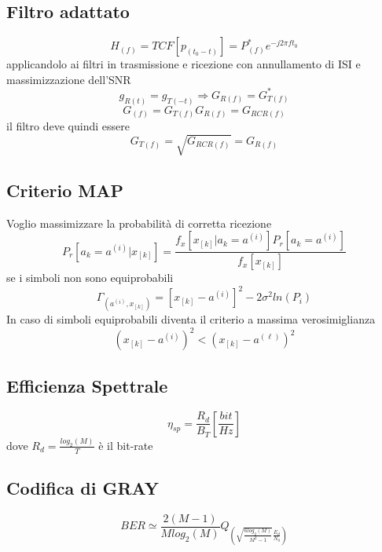     \subsection{Filtro adattato}
        \[
            H_{(f)} = TCF[p_{(t_0-t)}] = P^*_{(f)}e^{-j2\pi ft_0}    
        \]
        applicandolo ai filtri in trasmissione e ricezione con annullamento di ISI e massimizzazione dell'SNR
        \[
            g_{R(t)} = g_{T(-t)} \Rightarrow G_{R(f)} = G_{T(f)}^\ast
        \]
        \[
            G_{(f)} = G_{T(f)} G_{R(f)} = G_{RCR(f)} 
        \]
        il filtro deve quindi essere
        \[
            G_{T(f)} = \sqrt{G_{RCR(f)}} = G_{R(f)}    
        \] 
    \subsection{Criterio MAP}
        Voglio massimizzare la probabilità di 
        corretta ricezione 
        \[
            P_r[a_k = a^{(i)}|x_{[k]}] = \frac{f_x[x_{[k]}|a_k = a^{(i)}]P_r[a_k = a^{(i)}]}{f_x[x_{[k]}]}    
        \]
        se i simboli non sono equiprobabili
        \[
            \Gamma_{(a^{(i)},x_{[k]})} = \left[x_{[k]}-a^{(i)}\right]^2-2\sigma^2ln(P_i)
        \]
        In caso di simboli equiprobabili diventa il criterio a massima verosimiglianza
        \[
            \left(x_{[k]}-a^{(i)}\right)^2<\left(x_{[k]}-a^{(\ell)}\right)^2  
        \]
    \subsection{Efficienza Spettrale}
        \[
            \eta_{sp} = \frac{R_d}{B_T} [\frac{bit}{Hz}]    
        \]
        dove $R_d=\frac{log_2(M)}{T}$ è il bit-rate
    \subsection{Codifica di GRAY}
        \[
            BER \simeq \frac{2(M-1)}{Mlog_2(M)}Q_{\displaystyle \left(\sqrt{\frac{6log_2(M)}{M^2-1}}\frac{E_d}{N_0}\right)}    
        \] 
